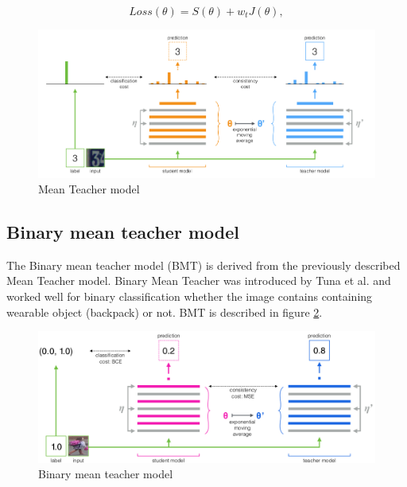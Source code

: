 \begin{equation}
	Loss(\theta) = S(\theta) + w_t J(\theta),
	\label{eq:mt-loss-sum}
\end{equation} 



\begin{figure}[h!]
    \centering
    \includegraphics[width=1\textwidth]{figs/mt.png}
    \caption{Mean Teacher model}
    \label{mtm}
\end{figure}


\subsection{Binary mean teacher model}
\label{bmt}
The Binary mean teacher model (BMT) is derived from the previously described Mean Teacher model. Binary Mean Teacher was introduced by Tuna et al.\cite{tuna-bmt} and worked well for binary classification whether the image contains containing wearable object (backpack) or not. BMT is described in figure \ref{fig:bmt}.

\begin{figure}[ht]
    \centering
    \includegraphics[width=1\textwidth]{figs/bmt.png}
    \caption{Binary mean teacher model}
    \label{fig:bmt}
\end{figure}


